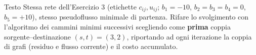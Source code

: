 \documentclass[11pt,a4paper]{article}
\begin{document}
\begin{testo}{Testo}
Stessa rete dell'Esercizio 3 (etichette $c_{ij},u_{ij}$; $b_1=-10$, $b_2=b_3=b_4=0$, $b_5=+10$),
stesso pseudoflusso minimale di partenza. Rifare lo svolgimento con l'algoritmo dei cammini
minimi successivi scegliendo come \textbf{prima} coppia sorgente--destinazione $(s,t)=(3,2)$,
riportando ad ogni iterazione la coppia di grafi (residuo e flusso corrente) e il costo
accumulato.
\end{testo}

\newcommand{\fsa}[7]{%
\gsa{
  \draw[a] (n1)--node[above left,lab]{2,6,#1}(n2);
  \draw[a] (n1)--node[below left,lab]{4,7,#2}(n3);
  \draw[a] (n2)--node[left,lab]{-2,4,#3}(n3);
  \draw[a] (n2)--node[above,lab]{5,5,#4}(n4);
  \draw[a] (n3)--node[above=6pt,lab]{1,6,#5}(n4);
  \draw[a] (n3)--node[below,lab]{6,5,#6}(n5);
  \draw[a] (n4)--node[right,lab]{2,8,#7}(n5);
}}
\end{document}
